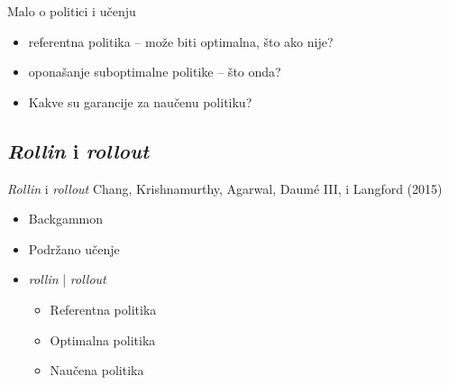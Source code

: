 \documentclass{beamer}
\begin{document}
\begin{frame}{Malo o politici i učenju}
\begin{itemize}
  \item referentna politika -- može biti optimalna, što ako nije?
  \item oponašanje suboptimalne politike -- što onda?
  \item Kakve su garancije za naučenu politiku?
\end{itemize}
\end{frame}


\subsection{\protect\textit{Rollin} i \protect\textit{rollout}}

\begin{frame}{\protect\textit{Rollin} i \protect\textit{rollout}}
{Chang, Krishnamurthy, Agarwal, Daumé III, i Langford (2015)}
  \begin{itemize}
  \item Backgammon
  \item Podržano učenje
  \item \textit{rollin} | \textit{rollout}
  \begin{itemize}
    \item Referentna politika
    \item Optimalna politika
    \item Naučena politika
  \end{itemize}
  \end{itemize}
\end{frame}
\end{document}
